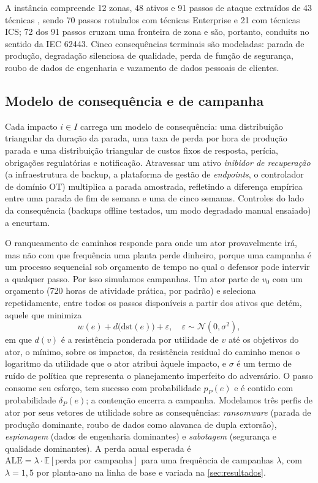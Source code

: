 A instância compreende 12 zonas, 48 ativos e 91 passos de ataque extraídos de
43 técnicas \attck{}, sendo 70 passos rotulados com técnicas Enterprise e 21
com técnicas ICS; 72 dos 91 passos cruzam uma fronteira de zona e são,
portanto, conduits no sentido da IEC 62443. Cinco consequências terminais são
modeladas: parada de produção, degradação silenciosa de qualidade, perda de
função de segurança, roubo de dados de engenharia e vazamento de dados pessoais
de clientes.



\subsection{Modelo de consequência e de campanha}

Cada impacto $i \in I$ carrega um modelo de consequência: uma distribuição
triangular da duração da parada, uma taxa de perda por hora de produção parada
e uma distribuição triangular de custos fixos de resposta, perícia, obrigações
regulatórias e notificação. Atravessar um ativo \emph{inibidor de recuperação} (a infraestrutura de
backup, a plataforma de gestão de \emph{endpoints}, o controlador de domínio
OT) multiplica a parada amostrada, refletindo a
diferença empírica entre uma parada de fim de semana e uma de cinco semanas.
Controles do lado da consequência (backups offline testados, um modo degradado
manual ensaiado) a encurtam.

O ranqueamento de caminhos responde para onde um ator provavelmente irá, mas
não com que frequência uma planta perde dinheiro, porque uma campanha é um
processo sequencial sob orçamento de tempo no qual o defensor pode intervir a
qualquer passo. Por isso simulamos campanhas. Um ator parte de $v_0$ com um
orçamento (720 horas de atividade prática, por padrão) e seleciona
repetidamente, entre todos os passos disponíveis a partir dos ativos que detém,
aquele que minimiza
\begin{equation}
w(e) + d\bigl(\mathrm{dst}(e)\bigr) + \varepsilon,\quad
\varepsilon \sim \mathcal{N}(0,\sigma^2),
\end{equation}
em que $d(v)$ é a resistência ponderada por utilidade de $v$ até os objetivos do ator, o mínimo, sobre os impactos, da resistência residual
do caminho menos o logaritmo da utilidade que o ator atribui àquele impacto, e
$\sigma$ é um termo de ruído de política que representa o planejamento imperfeito do
adversário. O passo consome seu esforço, tem sucesso com probabilidade $p_P(e)$
e é contido com probabilidade $\delta_P(e)$; a contenção encerra a campanha.
Modelamos três perfis de ator por seus vetores de utilidade sobre as
consequências: \emph{ransomware} (parada de produção dominante, roubo de dados
como alavanca de dupla extorsão), \emph{espionagem} (dados de engenharia
dominantes) e \emph{sabotagem} (segurança e qualidade dominantes). A perda
anual esperada é $\mathrm{ALE} = \lambda \cdot \mathbb{E}[\text{perda por
campanha}]$ para uma frequência de campanhas $\lambda$, com $\lambda = 1{,}5$
por planta-ano na linha de base e variada na \cref{sec:resultados}.

